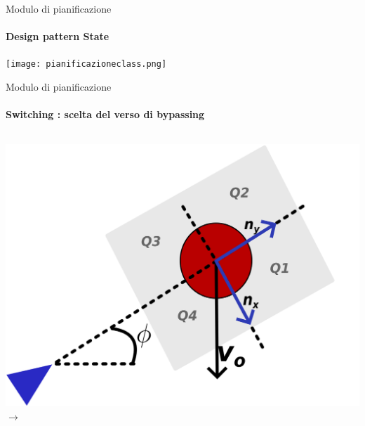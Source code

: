 \documentclass[handout]{beamer}
\begin{document}
\begin{frame}{Modulo di pianificazione}
\framesubtitle{Design pattern State}
\centering
\hspace{2cm}
\texttt{[image: pianificazioneclass.png]}
\end{frame}

\begin{frame}{Modulo di pianificazione}
\framesubtitle{Switching : scelta del verso di bypassing}
\begin{columns}
\centering
\includegraphics{sceltaverso.png}
\centering
$\rightarrow$
\centering

\end{columns}
\end{frame}
\end{document}
